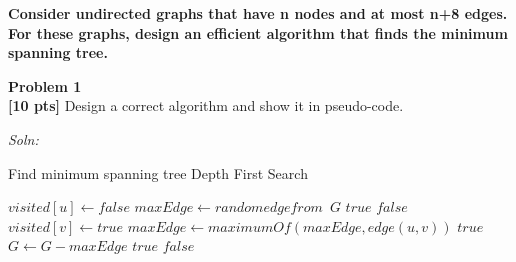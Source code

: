 \documentclass{article}
\newenvironment{problem}[2][Problem]
    { \begin{mdframed}[backgroundcolor=gray!20] \textbf{#1 #2} \\}
    {  \end{mdframed}}
\newenvironment{solution}
    {\textit{Soln:}}
    {}
\begin{document}
\begin{mdframed}[backgroundcolor=yellow!20]
\textbf{Consider undirected graphs that have n nodes and at most n+8 edges. For these graphs, design an efficient algorithm that finds the minimum spanning tree.} 
\end{mdframed}

\begin{problem}{1}
\textbf{[10 pts]} Design a correct algorithm and show it in pseudo-code.
\end{problem}
\begin{solution}
\begin{algorithm}
\caption{Find minimum spanning tree Depth First Search}\label{dfs}
\begin{algorithmic}[1]
        \State \texttt{$visited[u] \gets false$}
    \EndFor
    \State \texttt{$maxEdge \gets random edge from$ $G$}
                \State \Return \texttt{$true$}
            \EndIf
        \EndIf
    \EndFor
    \State \Return $false$
\EndProcedure
\newline
{}
    \State \texttt{$visited[v] \gets true$}
        \State \texttt{$maxEdge \gets maximumOf(maxEdge, edge(u ,v))$}
                \State \Return \texttt{$true$}
            \EndIf
        \Else
             
                \State \texttt{$G \gets G - maxEdge$}
                \State \Return $true$
            \EndIf
        \EndIf
    \EndFor
    \State \Return $false$
\EndProcedure
\end{algorithmic}
\end{algorithm}
\end{solution}
\end{document}
